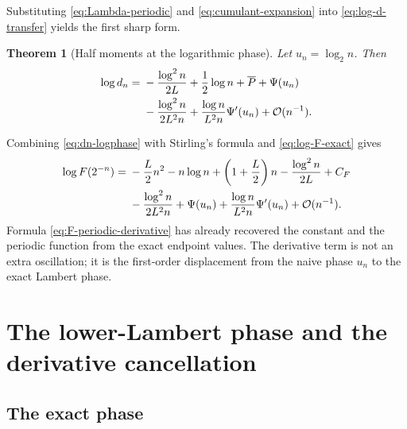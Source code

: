 \documentclass[11pt,oneside]{article}
\newtheorem{theorem}{Theorem}[section]
\theoremstyle{definition}
\theoremstyle{remark}
\newcommand{\bigO}{\mathcal O}
\begin{document}
Substituting \eqref{eq:Lambda-periodic} and \eqref{eq:cumulant-expansion} into
\eqref{eq:log-d-transfer} yields the first sharp form.

\begin{theorem}[Half moments at the logarithmic phase]
\label{thm:dn-logphase}
Let $u_n=\log_2n$.  Then
\begin{align}
 \log d_n={}&-\frac{\log^2n}{2L}+\frac12\log n
 +\overline P+\Psi(u_n)                                    \notag\\
 &-\frac{\log^2n}{2L^2n}
 +\frac{\log n}{L^2n}\Psi'(u_n)+\bigO(n^{-1}).             \label{eq:dn-logphase}
\end{align}
\end{theorem}

Combining \eqref{eq:dn-logphase} with Stirling's formula and
\eqref{eq:log-F-exact} gives
\begin{align}
 \log F(2^{-n})={}&-\frac L2n^2-n\log n+
 \left(1+\frac L2\right)n-\frac{\log^2n}{2L}+C_F           \notag\\
 &-\frac{\log^2n}{2L^2n}+\Psi(u_n)
 +\frac{\log n}{L^2n}\Psi'(u_n)+\bigO(n^{-1}).             \label{eq:F-periodic-derivative}
\end{align}
Formula \eqref{eq:F-periodic-derivative} has already recovered the constant and the periodic
function from the exact endpoint values.  The derivative term is not an extra oscillation; it
is the first-order displacement from the naive phase $u_n$ to the exact Lambert phase.

\section{The lower-Lambert phase and the derivative cancellation}
\label{sec:lambert-phase}

\subsection{The exact phase}
\end{document}
